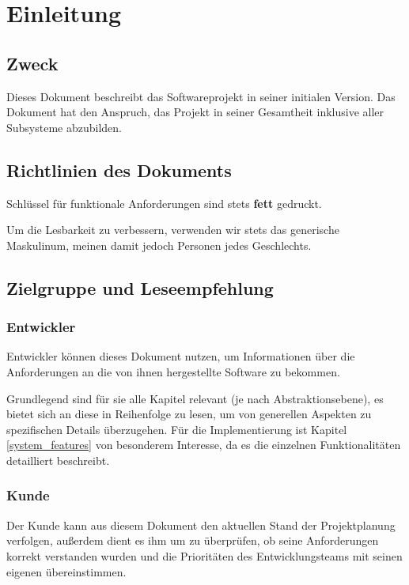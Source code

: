\section{Einleitung}
\subsection{Zweck}
Dieses Dokument beschreibt das Softwareprojekt  in seiner initialen Version.
Das Dokument hat den Anspruch, das Projekt in seiner Gesamtheit inklusive aller Subsysteme abzubilden.

\subsection{Richtlinien des Dokuments}

Schlüssel für funktionale Anforderungen sind stets \textbf{fett} gedruckt.

Um die Lesbarkeit zu verbessern, verwenden wir stets das generische Maskulinum, meinen damit jedoch Personen
jedes Geschlechts.

\subsection{Zielgruppe und Leseempfehlung}
\subsubsection{Entwickler}

Entwickler können dieses Dokument nutzen, um Informationen über die Anforderungen an die von ihnen hergestellte
Software zu bekommen.

Grundlegend sind für sie alle Kapitel relevant (je nach Abstraktionsebene),
es bietet sich an diese in Reihenfolge zu lesen, um von generellen Aspekten zu spezifischen Details überzugehen.
Für die Implementierung ist Kapitel \ref{system_features} von besonderem Interesse,
da es die einzelnen Funktionalitäten detailliert beschreibt.

\subsubsection{Kunde}
Der Kunde kann aus diesem Dokument den aktuellen Stand der Projektplanung verfolgen, 
außerdem dient es ihm um zu überprüfen, ob seine Anforderungen korrekt verstanden wurden
und die Prioritäten des Entwicklungsteams mit seinen eigenen übereinstimmen.

